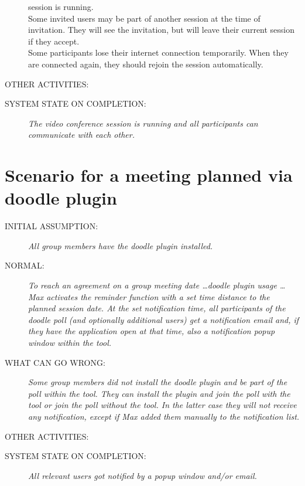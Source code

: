\begin{description}
{session is running.
\\Some invited users may be part of another session at the time of invitation.
They will see the invitation, but will leave their current session if they
accept.
\\Some participants lose their internet connection temporarily.
When they are connected again, they should rejoin the session automatically.}
\item[OTHER ACTIVITIES:]
\textit{ }
\item[SYSTEM STATE ON COMPLETION:]
\textit{The video conference session is running and all participants can
communicate with each other.}
\end{description}

\section{Scenario for a meeting planned via doodle plugin}
\begin{description}
\item[INITIAL ASSUMPTION:]
\textit{All group members have the doodle plugin installed.}
\item[NORMAL:]
\textit{To reach an agreement on a group meeting date \ldots doodle plugin usage
\ldots 
\\Max activates the reminder function with a set time distance to the planned
session date. At the set notification time, all participants of the doodle poll
(and optionally additional users) get a notification email and, if they have the
application open at that time, also a notification popup window within the tool.}
\item[WHAT CAN GO WRONG:]
\textit{Some group members did not install the doodle plugin and be part of the
poll within the tool. They can install the plugin and join the poll with the
tool or join the poll without the tool. In the latter case they will not receive
any notification, except if Max added them manually to the notification list.}
\item[OTHER ACTIVITIES:]
\textit{ }
\item[SYSTEM STATE ON COMPLETION:]
\textit{All relevant users got notified by a popup window and/or email.}
\end{description}


